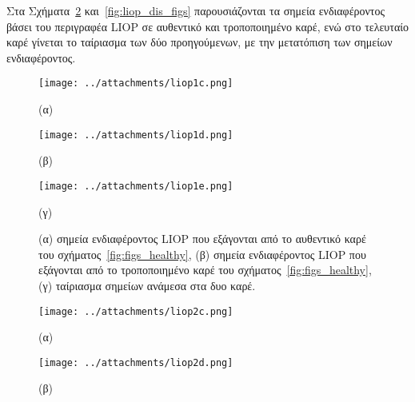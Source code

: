 Στα Σχήματα~\ref{fig:liop_healthy_figs} και~\ref{fig:liop_dis_figs} παρουσιάζονται τα σημεία ενδιαφέροντος βάσει του περιγραφέα LIOP σε αυθεντικό και τροποποιημένο καρέ, ενώ στο τελευταίο καρέ 
γίνεται το ταίριασμα των δύο προηγούμενων, με την μετατόπιση των σημείων ενδιαφέροντος.\\


\begin{figure}[!ht]
\begin{minipage}[b]{0.4\linewidth}
\centering
\texttt{[image: ../attachments/liop1c.png]}
\caption*{(α)}
\label{fig:liop_1}
\end{minipage}
\hspace{0.9cm}
\begin{minipage}[b]{0.7\linewidth}
\centering
\texttt{[image: ../attachments/liop1d.png]}
\caption*{(β)}
\label{fig:liop_2}
\end{minipage}

 \end{figure}
 


\begin{figure}[!h]
\begin{minipage}[b]{1.0\linewidth}
\centering
\texttt{[image: ../attachments/liop1e.png]}
\caption*{(γ)}
\label{fig:liop_3}
\end{minipage}
\caption{(α) σημεία ενδιαφέροντος LIOP που εξάγονται από το αυθεντικό καρέ του σχήματος~\ref{fig:figs_healthy},
(β) σημεία ενδιαφέροντος LIOP που εξάγονται από το τροποποιημένο καρέ του σχήματος~\ref{fig:figs_healthy},
(γ) ταίριασμα σημείων ανάμεσα στα δυο καρέ.}
\label{fig:liop_healthy_figs}
\end{figure}

\newpage


\begin{figure}[!ht]
\begin{minipage}[b]{0.4\linewidth}
\centering
\texttt{[image: ../attachments/liop2c.png]}
\caption*{(α)}
\label{fig:liop_4}
\end{minipage}
\hspace{0.9cm}
\begin{minipage}[b]{0.7\linewidth}
\centering
\texttt{[image: ../attachments/liop2d.png]}
\caption*{(β)}
\label{fig:liop_5}
\end{minipage}

 \end{figure}



